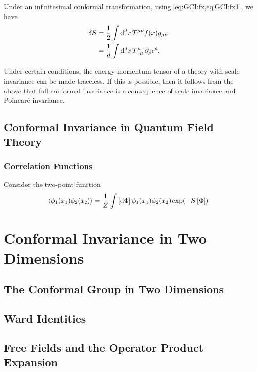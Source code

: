 \documentclass[10pt]{article}
\begin{document}
Under an infinitesimal conformal transformation, using \cref{eq:GCI:fx,eq:GCI:fx1}, we have 
\begin{align}
    \delta S&=\frac{1}{2}\int\dd[d]{x}T^{\mu\nu}f(x)g_{\mu\nu}\notag\\
            &=\frac{1}{d}\int\dd[d]{x}\tensor{T}{^\mu_\mu}\partial_\rho\epsilon^\rho.
\end{align}
\begin{intu}
    Under certain conditions, the energy-momentum tensor of a theory with scale invariance can be made traceless.
    If this is possible, then it follows from the above that full conformal invariance is a consequence of scale invariance and Poincar\'e invariance.
\end{intu}


\subsection{Conformal Invariance in Quantum Field Theory}
\subsubsection{Correlation Functions}
Consider the two-point function 
\begin{align}
    \expval{\phi_1(x_1)\phi_2(x_2)}=\frac{1}{Z}\int\left[\dd{\Phi}\right]\phi_1(x_1)\phi_2(x_2)\exp(-S\left[\Phi\right])
\end{align}
\section{Conformal Invariance in Two Dimensions}
\subsection{The Conformal Group in Two Dimensions}
\subsection{Ward Identities}
\subsection{Free Fields and the Operator Product Expansion}

\clearpage


\end{document}
